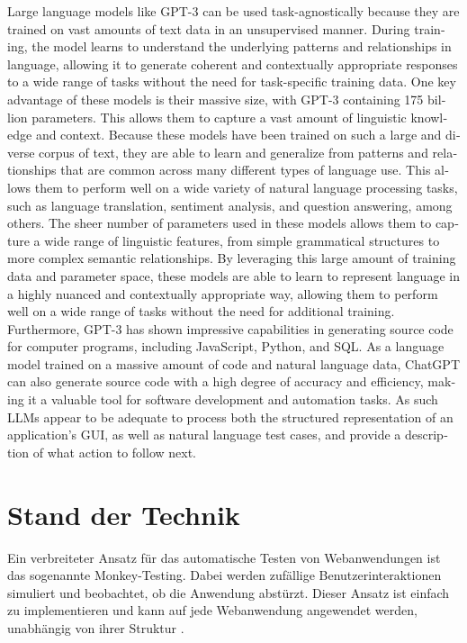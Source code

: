 \begin{otherlanguage}{english}
Large language models like GPT-3 can be used task-agnostically because they are trained on vast amounts of text data in an unsupervised manner. During training, the model learns to understand the underlying patterns and relationships in language, allowing it to generate coherent and contextually appropriate responses to a wide range of tasks without the need for task-specific training data.
One key advantage of these models is their massive size, with GPT-3 containing 175 billion parameters.
This allows them to capture a vast amount of linguistic knowledge and context.
Because these models have been trained on such a large and diverse corpus of text, they are able to learn and generalize from patterns and relationships that are common across many different types of language use. This allows them to perform well on a wide variety of natural language processing tasks, such as language translation, sentiment analysis, and question answering, among others.
The sheer number of parameters used in these models allows them to capture a wide range of linguistic features, from simple grammatical structures to more complex semantic relationships. By leveraging this large amount of training data and parameter space, these models are able to learn to represent language in a highly nuanced and contextually appropriate way, allowing them to perform well on a wide range of tasks without the need for additional training.
Furthermore, GPT-3 has shown impressive capabilities in generating source code for computer programs, including JavaScript, Python, and SQL. As a language model trained on a massive amount of code and natural language data, ChatGPT can also generate source code with a high degree of accuracy and efficiency, making it a valuable tool for software development and automation tasks.
As such LLMs appear to be adequate to process both the structured representation of an application’s GUI, as well as natural language test cases, and provide a description of what action to follow next.
\end{otherlanguage}

\chapter{Stand der Technik}
\label{ch:RelatedWork}

Ein verbreiteter Ansatz für das automatische Testen von Webanwendungen ist das sogenannte Monkey-Testing.
Dabei werden zufällige Benutzerinteraktionen simuliert und beobachtet, ob die Anwendung abstürzt.
Dieser Ansatz ist einfach zu implementieren und kann auf jede Webanwendung angewendet werden, unabhängig von ihrer Struktur \cite{monkey_testing}.

